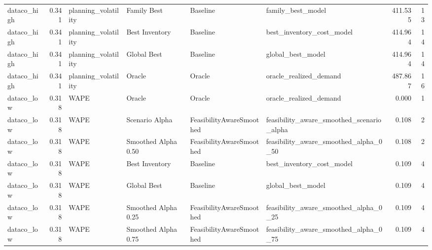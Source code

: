 \begin{table}
{\begin{tabular}{lrllllrr}
   dataco\_high &             0.341 &         planning\_volatility &           Family Best &                  Baseline &                                  family\_best\_model &       411.535 &              13 \\
   dataco\_high &             0.341 &         planning\_volatility &        Best Inventory &                  Baseline &                          best\_inventory\_cost\_model &       414.964 &              14 \\
   dataco\_high &             0.341 &         planning\_volatility &           Global Best &                  Baseline &                                  global\_best\_model &       414.964 &              14 \\
   dataco\_high &             0.341 &         planning\_volatility &                Oracle &                    Oracle &                             oracle\_realized\_demand &       487.867 &              16 \\
    dataco\_low &             0.318 &                        WAPE &                Oracle &                    Oracle &                             oracle\_realized\_demand &         0.000 &               1 \\
    dataco\_low &             0.318 &                        WAPE &        Scenario Alpha &  FeasibilityAwareSmoothed &          feasibility\_aware\_smoothed\_scenario\_alpha &         0.108 &               2 \\
    dataco\_low &             0.318 &                        WAPE &   Smoothed Alpha 0.50 &  FeasibilityAwareSmoothed &              feasibility\_aware\_smoothed\_alpha\_0\_50 &         0.108 &               2 \\
    dataco\_low &             0.318 &                        WAPE &        Best Inventory &                  Baseline &                          best\_inventory\_cost\_model &         0.109 &               4 \\
    dataco\_low &             0.318 &                        WAPE &           Global Best &                  Baseline &                                  global\_best\_model &         0.109 &               4 \\
    dataco\_low &             0.318 &                        WAPE &   Smoothed Alpha 0.25 &  FeasibilityAwareSmoothed &              feasibility\_aware\_smoothed\_alpha\_0\_25 &         0.109 &               4 \\
    dataco\_low &             0.318 &                        WAPE &   Smoothed Alpha 0.75 &  FeasibilityAwareSmoothed &              feasibility\_aware\_smoothed\_alpha\_0\_75 &         0.109 &               4 \\

\end{tabular}}
\end{table}
